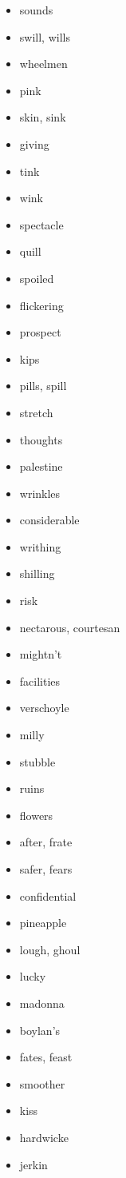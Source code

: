 \documentclass{article}
\begin{document}
\begin{itemize}
    \item sounds
    \item swill, wills
    \item wheelmen
    \item pink
    \item skin, sink
    \item giving
    \item tink
    \item wink
    \item spectacle
    \item quill
    \item spoiled
    \item flickering
    \item prospect
    \item kips
    \item pills, spill
    \item stretch
    \item thoughts
    \item palestine
    \item wrinkles
    \item considerable
    \item writhing
    \item shilling
    \item risk
    \item nectarous, courtesan
    \item mightn't
    \item facilities
    \item verschoyle
    \item milly
    \item stubble
    \item ruins
    \item flowers
    \item after, frate
    \item safer, fears
    \item confidential
    \item pineapple
    \item lough, ghoul
    \item lucky
    \item madonna
    \item boylan's
    \item fates, feast
    \item smoother
    \item kiss
    \item hardwicke
    \item jerkin

\end{itemize}
\end{document}
